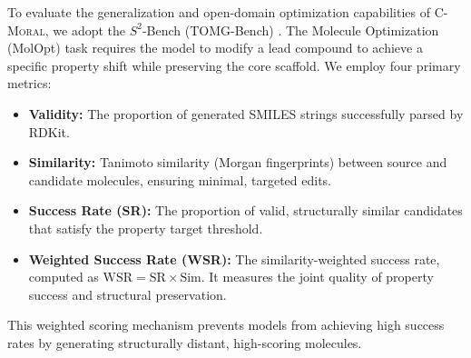 \documentclass[11pt]{article}
\begin{document}
To evaluate the generalization and open-domain optimization capabilities of \textsc{C-Moral}, we adopt the $S^2$-Bench (TOMG-Bench) \cite{li2025speaktostructureevaluatingllmsopendomain}. The Molecule Optimization (MolOpt) task requires the model to modify a lead compound to achieve a specific property shift while preserving the core scaffold. We employ four primary metrics:
\begin{itemize}
    \item \textbf{Validity:} The proportion of generated SMILES strings successfully parsed by RDKit.
    \item \textbf{Similarity:} Tanimoto similarity (Morgan fingerprints) between source and candidate molecules, ensuring minimal, targeted edits.
    \item \textbf{Success Rate (SR):} The proportion of valid, structurally similar candidates that satisfy the property target threshold.
    \item \textbf{Weighted Success Rate (WSR):} The  similarity-weighted success rate, computed as $\mathrm{WSR} = \mathrm{SR} \times \mathrm{Sim}$. It measures the joint quality of property success and
    structural preservation.
\end{itemize}

This weighted scoring mechanism prevents models from achieving high success rates by generating structurally distant, high-scoring molecules.



\end{document}
